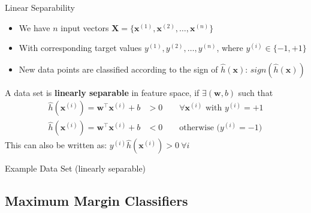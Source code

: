 \begin{frame}{Linear Separability}{}
	\begin{itemize}
		\item We have $n$ input vectors $\bm{X} = \{ \bm{x}^{(1)}, \bm{x}^{(2)}, \dots, \bm{x}^{(n)} \}$
		\item With corresponding target values $y^{(1)}, y^{(2)}, \dots, y^{(n)}$, where $y^{(i)} \in \{-1, +1\}$
		\item New data points are classified according to the sign of $\widehat{h}(\bm{x})$: $sign(\widehat{h}(\bm{x}))$
	\end{itemize}
	
	\vspace*{1mm}
	\begin{boxBlueNoFrame}
		\footnotesize
		A data set is \textbf{linearly separable} in feature space, if $\exists (\bm{w}, b)$ such that
		\begin{align}
			\widehat{h}(\bm{x}^{(i)}) = \bm{w}^{\intercal} \bm{x}^{(i)} + b &> 0 \qquad
				\text{$\forall \bm{x}^{(i)}$ with $y^{(i)} = +1$} \\
			\widehat{h}(\bm{x}^{(i)}) = \bm{w}^{\intercal} \bm{x}^{(i)} + b &< 0 \qquad
				\text{otherwise ($y^{(i)} = -1$)}
		\end{align}
		This can also be written as: $y^{(i)} \widehat{h}(\bm{x}^{(i)}) > 0\ \forall i$ 
	\end{boxBlueNoFrame}
\end{frame}


\begin{frame}{Example Data Set (linearly separable)}{}
\end{frame}


\subsection{Maximum Margin Classifiers}

